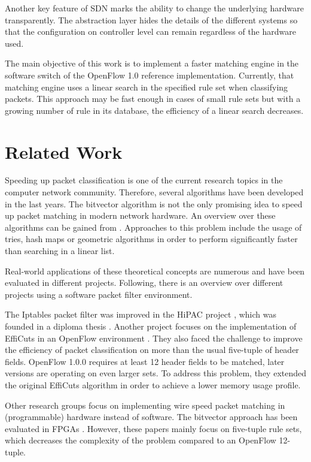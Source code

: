 \documentclass[a4paper,
		12pt,
		parskip=full,
		titlepage
		]{scrartcl}
\begin{document}
Another key feature of SDN marks the ability to change the underlying hardware transparently.
The abstraction layer hides the details of the different systems so that the configuration on controller level can remain regardless of the hardware used.

The main objective of this work is to implement a faster matching engine in the software switch of the OpenFlow 1.0 reference implementation.
Currently, that matching engine uses a linear search in the specified rule set when classifying packets.
This approach may be fast enough in cases of small rule sets but with a growing number of rule in its database, the efficiency of a linear search decreases.


\section{Related Work}
Speeding up packet classification is one of the current research topics in the computer network community.
Therefore, several algorithms have been developed in the last years.
The bitvector algorithm is not the only promising idea to speed up packet matching in modern network hardware.
An overview over these algorithms can be gained from \cite{algorithms_survey}.%
Approaches to this problem include the usage of tries, hash maps or geometric algorithms\cite{hicuts}
in order to perform significantly faster than searching in a linear list.

Real-world applications of these theoretical concepts are numerous and have been evaluated in different projects.
Following, there is an overview over different projects using a software packet filter environment.

The Iptables\cite{iptables} packet filter was improved in the HiPAC project \cite{hipac}, which was founded in a diploma thesis \cite{heinzhigh}.
Another project focuses on the implementation of EffiCuts in an OpenFlow environment \cite{stimpfling2013optimal}.
They also faced the challenge to improve the efficiency of packet classification on more than the usual five-tuple of header fields.
OpenFlow 1.0.0 \cite{openflow_spec10} requires at least 12 header fields to be matched, later versions are operating on even larger sets.
To address this problem, they extended the original EffiCuts algorithm in order to achieve a lower memory usage profile.

Other research groups focus on implementing wire speed packet matching in (programmable) hardware instead of software.
The bitvector approach \cite{bv} has been evaluated in FPGAs \cite{bitvector_fpga} \cite{qu2013fast}.
However, these papers mainly focus on five-tuple rule sets, which decreases the complexity of the problem compared to an OpenFlow 12-tuple.
\end{document}

